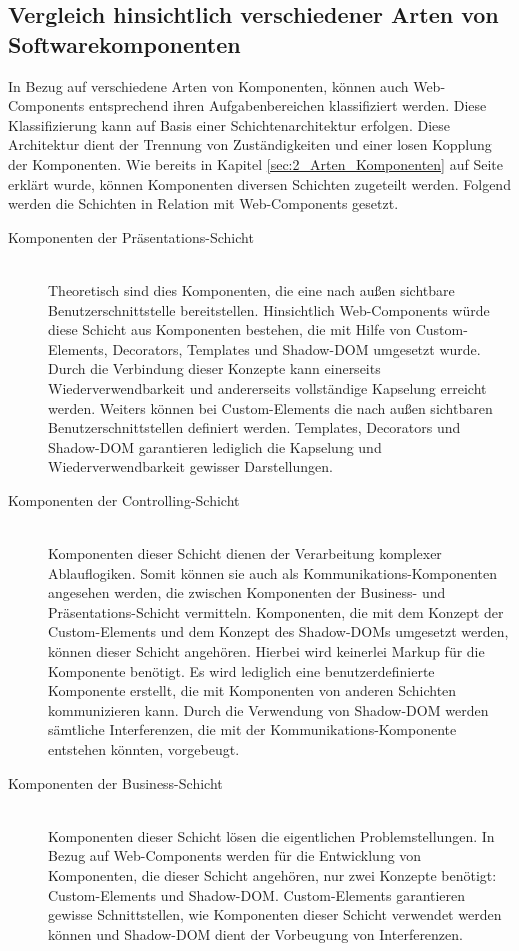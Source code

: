 \subsection{Vergleich hinsichtlich verschiedener Arten von Softwarekomponenten}
In Bezug auf verschiedene Arten von Komponenten, können auch Web-Components entsprechend ihren Aufgabenbereichen klassifiziert werden. Diese Klassifizierung kann auf Basis einer Schichtenarchitektur erfolgen. Diese Architektur dient der Trennung von Zuständigkeiten und einer losen Kopplung der Komponenten. Wie bereits in Kapitel \ref{sec:2_Arten_Komponenten} auf Seite \pageref{sec:2_Arten_Komponenten} erklärt wurde, können Komponenten diversen Schichten zugeteilt werden. Folgend werden die Schichten in Relation mit Web-Components gesetzt.

\begin{description}
\item[Komponenten der Präsentations-Schicht] \hfill \\
Theoretisch sind dies Komponenten, die eine nach außen sichtbare Benutzerschnittstelle bereitstellen. Hinsichtlich Web-Components würde diese Schicht aus Komponenten bestehen, die mit Hilfe von Custom-Elements, Decorators, Templates und Shadow-DOM umgesetzt wurde. Durch die Verbindung dieser Konzepte kann einerseits Wiederverwendbarkeit und andererseits vollständige Kapselung erreicht werden. Weiters können bei Custom-Elements die nach außen sichtbaren Benutzerschnittstellen definiert werden. Templates, Decorators und Shadow-DOM garantieren lediglich die Kapselung und Wiederverwendbarkeit gewisser Darstellungen.

\item[Komponenten der Controlling-Schicht] \hfill \\
Komponenten dieser Schicht dienen der Verarbeitung komplexer Ablauflogiken. Somit können sie auch als Kommunikations-Komponenten angesehen werden, die zwischen Komponenten der Business- und Präsentations-Schicht vermitteln. Komponenten, die mit dem Konzept der Custom-Elements und dem Konzept des Shadow-DOMs umgesetzt werden, können dieser Schicht angehören. Hierbei wird keinerlei Markup für die Komponente benötigt. Es wird lediglich eine benutzerdefinierte Komponente erstellt, die mit Komponenten von anderen Schichten kommunizieren kann. Durch die Verwendung von Shadow-DOM werden sämtliche Interferenzen, die mit der Kommunikations-Komponente entstehen könnten, vorgebeugt.

\item[Komponenten der Business-Schicht] \hfill \\
Komponenten dieser Schicht lösen die eigentlichen Problemstellungen. In Bezug auf Web-Components werden für die Entwicklung von Komponenten, die dieser Schicht angehören, nur zwei Konzepte benötigt: Custom-Elements und Shadow-DOM. Custom-Elements garantieren gewisse Schnittstellen, wie Komponenten dieser Schicht verwendet werden können und Shadow-DOM dient der Vorbeugung von Interferenzen.


\end{description}
